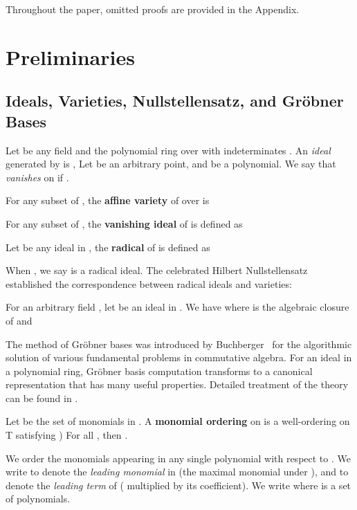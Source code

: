 \documentclass[envcountsect]{llncs}
\begin{document}
Throughout the paper, omitted proofs are provided in the Appendix.

\section{Preliminaries}
\subsection{Ideals, Varieties, Nullstellensatz, and Gr\"obner Bases}

Let  be any field and  the polynomial ring over  with indeterminates . An {\em ideal} generated by  is ,  Let  be an arbitrary point, and  be a polynomial. We say that  {\em vanishes} on  if . 
\begin{definition}
For any subset  of , the {\bf affine variety} of  over  is {}
\end{definition}
\begin{definition}
For any subset  of , the {\bf vanishing ideal}
of  is defined as 
\end{definition}
\begin{definition}
Let  be any ideal in , the {\bf radical} of  is defined as 
\end{definition}
 When , we say  is a radical ideal. The celebrated Hilbert Nullstellensatz established the correspondence between radical ideals and varieties:
\begin{theorem}\label{sN}
For an arbitrary field , let  be an ideal in . We have  where  is the algebraic closure of  and 
\end{theorem}

The method of Gr\"obner bases was introduced by Buchberger~\cite{buchberger76} for the algorithmic solution of various fundamental problems in commutative algebra. For an ideal  in a polynomial ring, Gr\"obner basis computation transforms  to a canonical representation  that has many useful properties. Detailed treatment of the theory can be found in \cite{grobnerbook}. 

\begin{definition}
Let  be the set of monomials in . A {\bf monomial ordering}  on  is a well-ordering on T satisfying \2) For all ,  then .
\end{definition}

We order the monomials appearing in any single polynomial  with respect to . We write  to denote the {\em leading monomial} in  (the maximal monomial under ), and  to denote the {\em leading term} of  ( multiplied by its coefficient). We write  where  is a set of polynomials.
\end{document}
